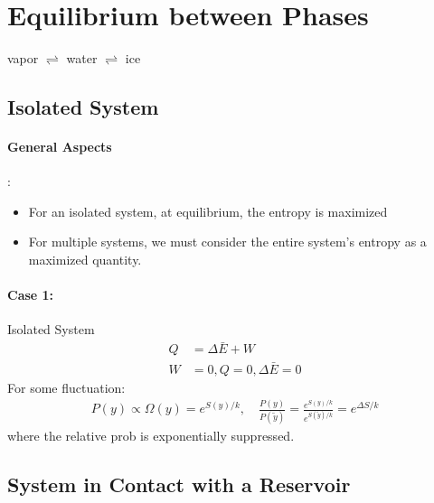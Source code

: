 \documentclass[../main.tex]{subfiles}
\begin{document}
\pagestyle{fancy}


\section{Equilibrium between Phases}
vapor $\rightleftharpoons$ water $\rightleftharpoons$ ice

\subsection{Isolated System}
\paragraph{General Aspects}:
\begin{itemize}
    \item For an isolated system, at equilibrium, the entropy is maximized
    \item For multiple systems, we must consider the entire system's entropy as a maximized quantity.
\end{itemize}

\paragraph{Case 1:} Isolated System
\begin{align*}
    Q &= \Delta \bar E + W \\
    W &= 0, Q = 0, \Delta \bar E = 0
\end{align*}
For some fluctuation:
\begin{align*}
    P(y) \propto \Omega (y) = e^{S(y)/k}, \quad
    \frac{P(y)}{P(\tilde y)} = \frac{e^{S(y)/k}}{e^{S(\tilde y)/k}} = e^{\Delta S/k}
\end{align*}
where the relative prob is exponentially suppressed.

\subsection{System in Contact with a Reservoir}
\end{document}

